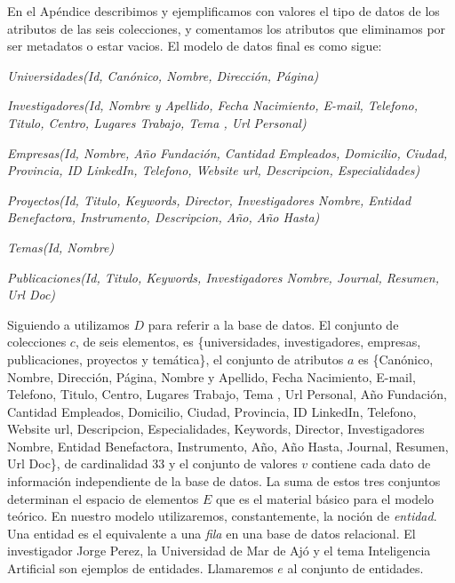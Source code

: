 En el Apéndice  describimos y ejemplificamos con valores el tipo de datos de los atributos de las seis colecciones, y comentamos los atributos que eliminamos por ser metadatos o estar vacios. El modelo de datos final es como sigue: \newline

\textit{Universidades(Id, Canónico, Nombre, Dirección, Página)} \newline

\textit{Investigadores(Id, Nombre y Apellido,	Fecha Nacimiento,	E-mail,   Telefono,   Titulo,  Centro, Lugares Trabajo,	Tema ,	Url Personal)} \newline

\textit{Empresas(Id, Nombre, Año Fundación, Cantidad Empleados, Domicilio, Ciudad, Provincia, ID LinkedIn, Telefono, Website url, Descripcion, Especialidades)} \newline

\textit{Proyectos(Id, Titulo, Keywords, Director, Investigadores Nombre, Entidad Benefactora, Instrumento, Descripcion, Año, Año Hasta)} \newline

\textit{Temas(Id, Nombre)} \newline

\textit{Publicaciones(Id, Titulo, Keywords, Investigadores Nombre, Journal, Resumen, Url Doc)}


Siguiendo a \cite{QADB1} utilizamos $D$ para referir a la base de datos. El conjunto de colecciones $c$, de seis elementos, es \{universidades, investigadores, empresas, publicaciones, proyectos y temática\}, el conjunto de atributos $a$ es \{Canónico, Nombre, Dirección, Página, Nombre y Apellido, Fecha Nacimiento, E-mail, Telefono, Titulo, Centro, Lugares Trabajo, Tema , Url Personal, Año Fundación, Cantidad Empleados, Domicilio, Ciudad, Provincia, ID LinkedIn, Telefono, Website url, Descripcion, Especialidades, Keywords, Director, Investigadores Nombre, Entidad Benefactora, Instrumento, Año, Año Hasta, Journal, Resumen, Url Doc\}, de cardinalidad 33 y el conjunto de valores $v$ contiene cada dato de información independiente de la base de datos. La suma de estos tres conjuntos determinan el espacio de elementos $E$ que es el material básico para el modelo teórico. En nuestro modelo utilizaremos, constantemente, la noción de \textit{entidad}. Una entidad es el equivalente a una \textit{fila} en una base de datos relacional. El investigador Jorge Perez, la Universidad de Mar de Ajó y el tema Inteligencia Artificial son ejemplos de entidades. Llamaremos $e$ al conjunto de entidades.

